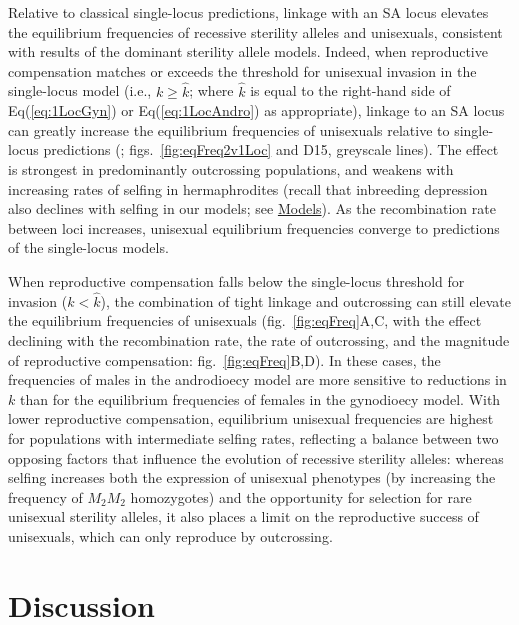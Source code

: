 \documentclass{article}
\begin{document}
Relative to classical single-locus predictions, linkage with an SA locus elevates the equilibrium frequencies of recessive sterility alleles and unisexuals, consistent with results of the dominant sterility allele models. Indeed, when reproductive compensation matches or exceeds the threshold for unisexual invasion in the single-locus model (i.e., $k \geq \hat{k}$; where $\hat{k}$ is equal to the right-hand side of Eq(\ref{eq:1LocGyn}) or Eq(\ref{eq:1LocAndro}) as appropriate), linkage to an SA locus can greatly increase the equilibrium frequencies of unisexuals relative to single-locus predictions (\citealt{Charlesworth1978a}; figs.~\ref{fig:eqFreq2v1Loc} and D15, greyscale lines). The effect is strongest in predominantly outcrossing populations, and weakens with increasing rates of selfing in hermaphrodites (recall that inbreeding depression also declines with selfing in our models; see \hyperref[sec:Models]{Models}). As the recombination rate between loci increases, unisexual equilibrium frequencies converge to predictions of the single-locus models.

When reproductive compensation falls below the single-locus threshold for invasion ($k < \hat{k}$), the combination of tight linkage and outcrossing can still elevate the equilibrium frequencies of unisexuals (fig.~\ref{fig:eqFreq}A,C, with the effect declining with the recombination rate, the rate of outcrossing, and the magnitude of reproductive compensation: fig.~\ref{fig:eqFreq}B,D). In these cases, the frequencies of males in the androdioecy model are more sensitive to reductions in $k$ than for the equilibrium frequencies of females in the gynodioecy model. With lower reproductive compensation, equilibrium unisexual frequencies are highest for populations with intermediate selfing rates, reflecting a balance between two opposing factors that influence the evolution of recessive sterility alleles: whereas selfing increases both the expression of unisexual phenotypes (by increasing the frequency of $M_2 M_2$ homozygotes) and the opportunity for selection for rare unisexual sterility alleles, it also places a limit on the reproductive success of unisexuals, which can only reproduce by outcrossing.





\section*{Discussion} \label{sec:Discussion}
\end{document}
